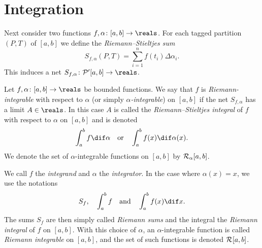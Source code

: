 \documentclass[article, a4paper, 11pt, oneside]{memoir}
\numberwithin{equation}{chapter}
\newcommand{\calP}{\mathcal{P}}
\begin{document}
\section{Integration}

Next consider two functions $f, \alpha \colon [a,b] \to \reals$. For each tagged partition $(P,T)$ of $[a,b]$ we define the \emph{Riemann--Stieltjes sum}
%
\begin{equation*}
    S_{f,\alpha}(P,T)
        = \sum_{i=1}^n f(t_i) \Delta\alpha_i.
\end{equation*}
%
This induces a net $S_{f,\alpha} \colon \calP'[a,b] \to \reals$.


\begin{definition}
    Let $f,\alpha \colon [a,b] \to \reals$ be bounded functions. We say that $f$ is \emph{Riemann-integrable} with respect to $\alpha$ (or simply \emph{$\alpha$-integrable}) on $[a,b]$ if the net $S_{f,\alpha}$ has a limit $A \in \reals$. In this case $A$ is called the \emph{Riemann--Stieltjes integral} of $f$ with respect to $\alpha$ on $[a,b]$ and is denoted
    \begin{equation*}
        \int_a^b f \dif \alpha
        \quad \text{or} \quad
        \int_a^b f(x) \dif \alpha(x).
    \end{equation*}
    We denote the set of $\alpha$-integrable functions on $[a,b]$ by $\integrable[\alpha]{a,b}$.
\end{definition}
%
We call $f$ the \emph{integrand} and $\alpha$ the \emph{integrator}. In the case where $\alpha(x) = x$, we use the notations
%
\begin{equation*}
    S_f,
    \quad
    \int_a^b f
    \quad \text{and} \quad
    \int_a^b f(x) \dif x.
\end{equation*}
%
The sums $S_f$ are then simply called \emph{Riemann sums} and the integral the \emph{Riemann integral} of $f$ on $[a,b]$. With this choice of $\alpha$, an $\alpha$-integrable function is called \emph{Riemann integrable} on $[a,b]$, and the set of such functions is denoted $\integrable{a,b}$.
\end{document}
